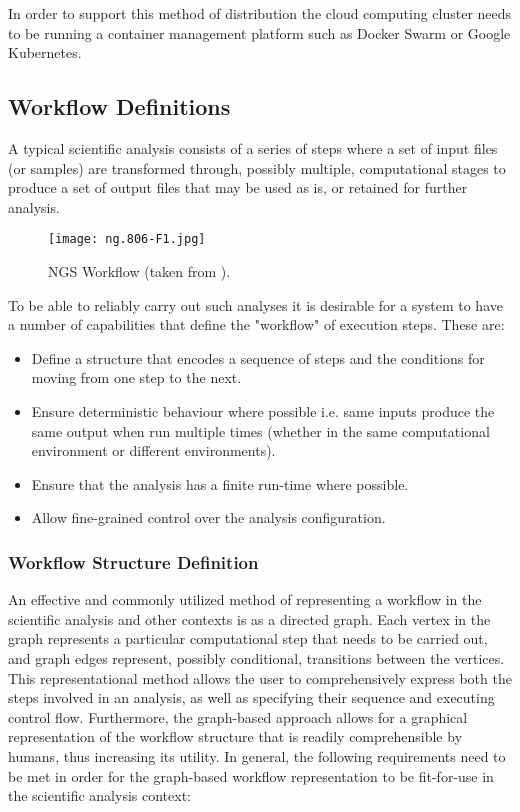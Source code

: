 In order to support this method of distribution the cloud computing cluster needs to be running a container management platform such as Docker Swarm or Google Kubernetes.

\subsection {Workflow Definitions} \label{sec:workflow_definitions}
A typical scientific analysis consists of a series of steps where a set of input files (or samples) are transformed through, possibly multiple, computational stages to produce a set of output files that may be used as is, or retained for further analysis. 

\begin{figure}[h]
\texttt{[image: ng.806-F1.jpg]}
\centering
\caption {NGS Workflow (taken from \autocite{depristo2011framework}).}
\label{fig:ng.806-F1.jpg}
\end{figure}


To be able to reliably carry out such analyses it is desirable for a system to have a number of capabilities that define the "workflow" of execution steps. These are:

\begin{itemize}
\item Define a structure that encodes a sequence of steps and the conditions for moving from one step to the next.
\item Ensure deterministic behaviour where possible i.e. same inputs produce the same output when run multiple times (whether in the same computational environment or different environments).
\item Ensure that the analysis has a finite run-time where possible.
\item Allow fine-grained control over the analysis configuration. 
\end{itemize}

\subsubsection{Workflow Structure Definition}
An effective and commonly utilized method of representing a workflow in the scientific analysis and other contexts is as a directed graph. Each vertex in the graph represents a particular computational step that needs to be carried out, and graph edges represent, possibly conditional, transitions between the vertices. This representational method allows the user to comprehensively express both the steps involved in an analysis, as well as specifying their sequence and executing control flow. Furthermore, the graph-based approach allows for a graphical representation of the workflow structure that is readily comprehensible by humans, thus increasing its utility. In general, the following requirements need to be met in order for the graph-based workflow representation to be fit-for-use in the scientific analysis context:

